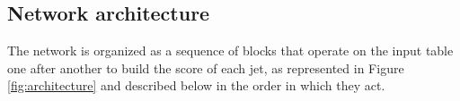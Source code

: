 

\subsection{Network architecture}
\label{subsec:network}
%
The network is organized as a sequence of blocks that operate on the input table one after another to build the score of each jet, as represented in Figure \ref{fig:architecture} and described below in the order in which they act.\medskip 
%
